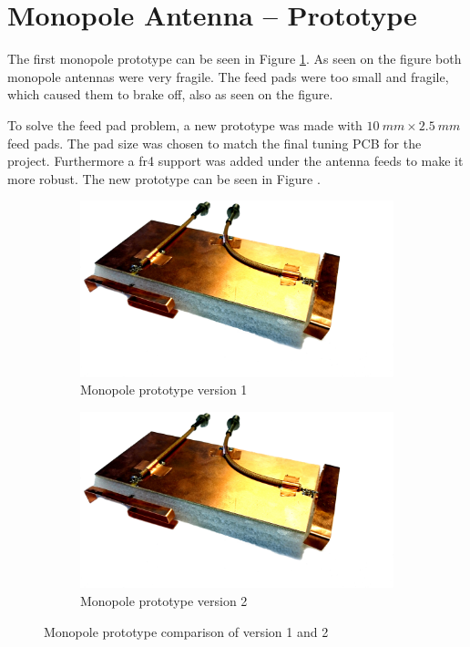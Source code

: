 \section{Monopole Antenna -- Prototype}
The first monopole prototype can be seen in Figure \ref{fig:ant1_proto1_3d}. As seen on the figure both monopole antennas were very fragile. The feed pads were too small and fragile, which caused them to brake off, also as seen on the figure.

To solve the feed pad problem, a new prototype was made with $\SI{10}{mm}\times \SI{2.5}{mm}$ feed pads. The pad size was chosen to match the final tuning PCB for the project. Furthermore a fr4 support was added under the antenna feeds to make it more robust. The new prototype can be seen in Figure .

\begin{figure}[htbp]
   \begin{subfigure}[b]{0.49\linewidth}
        \centering
        \includegraphics[scale=0.08]{img/tech_sol/monopole/prototype_v1/monopole_v1}
        \caption{Monopole prototype version 1}
        \label{fig:ant1_proto1_3d}
    \end{subfigure}
    \hfill
    \begin{subfigure}[b]{0.49\linewidth}
        \centering
        \includegraphics[scale=0.08]{img/tech_sol/monopole/prototype_v1/monopole_v1}
        \caption{Monopole prototype version 2}
        \label{fig:ant1_proto2_3d}
    \end{subfigure}
    \caption{Monopole prototype comparison of version 1 and 2}
    \label{fig:ant_1_proto_3d}
\end{figure}

